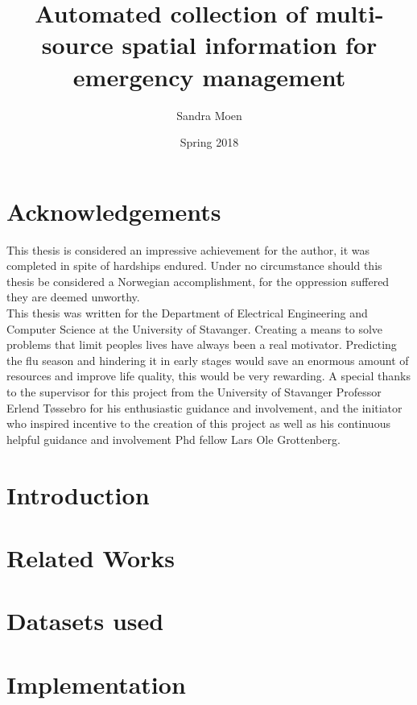 \documentclass[12pt, twoside]{report}
\title{Automated collection of multi-source spatial information for emergency management}
\author{Sandra Moen}
\date{Spring 2018}
\begin{document}






\chapter*{Acknowledgements}
This thesis is considered an impressive achievement for the author, it was completed in spite of hardships endured. Under no circumstance should this thesis be considered a Norwegian accomplishment, for the oppression suffered they are deemed unworthy.
\newline \\
This thesis was written for the Department of Electrical Engineering and Computer Science at the University of Stavanger. Creating a means to solve problems that limit peoples lives have always been a real motivator. Predicting the flu season and hindering it in early stages would save an enormous amount of resources and improve life quality, this would be very rewarding. A special thanks to the supervisor for this project from the University of Stavanger Professor Erlend Tøssebro for his enthusiastic guidance and involvement, and the initiator who inspired incentive to the creation of this project as well as his continuous helpful guidance and involvement Phd fellow Lars Ole Grottenberg.

\setcounter{secnumdepth}{5}
\setcounter{tocdepth}{5}
\tableofcontents
\listoffigures
\listoftables

\chapter{Introduction}


\chapter{Related Works}


\chapter{Datasets used}


\chapter{Implementation}

\end{document}
